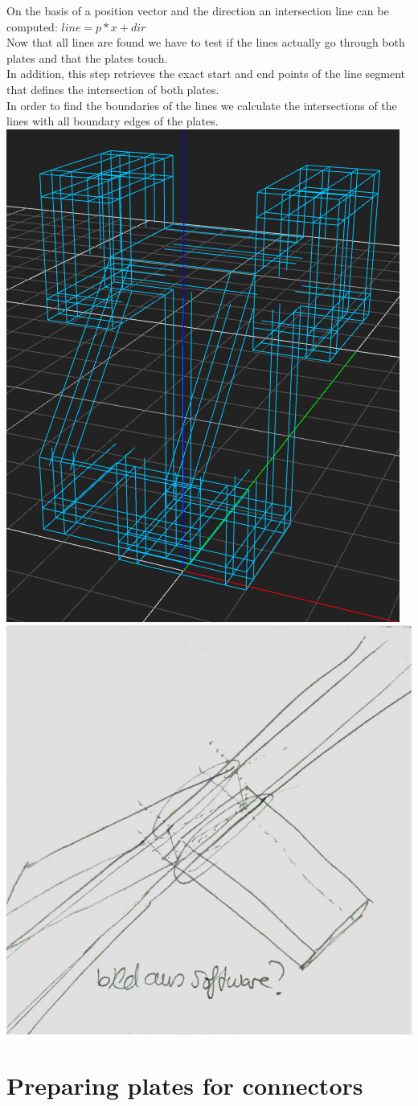 \documentclass[../ClassicThesis.tex]{subfiles}
\begin{document}
On the basis of a position vector and the direction an intersection line can be computed: $ line = p*x + dir$
\\
Now that all lines are found we have to test if the lines actually go through both plates and that the plates touch. \\
In addition, this step retrieves the exact start and end points of the line segment that defines the intersection of both plates.\\
In order to find the boundaries of the lines we calculate the intersections of the lines with all boundary edges of the plates.\\
\includegraphics[width=.5\columnwidth]{Images/HeadAllBoundaries.png}
\\
\includegraphics[width=.5\columnwidth]{Images/06-1-graph-fourIntersectionLines.jpg}

\section{Preparing plates for connectors}
\end{document}
